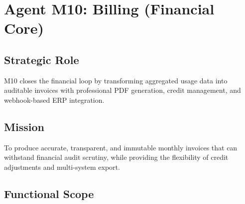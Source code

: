 \documentclass[12pt,a4paper,twoside]{report}
\begin{document}
\section{Agent M10: Billing (Financial Core)}

\subsection{Strategic Role}
M10 closes the financial loop by transforming aggregated usage data into auditable invoices with professional PDF generation, credit management, and webhook-based ERP integration.

\subsection{Mission}
To produce accurate, transparent, and immutable monthly invoices that can withstand financial audit scrutiny, while providing the flexibility of credit adjustments and multi-system export.

\subsection{Functional Scope}
\end{document}
